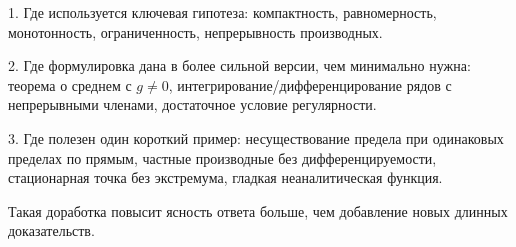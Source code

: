 \documentclass[12pt,a4paper]{article}
\begin{document}
1. Где используется ключевая гипотеза: компактность, равномерность,
монотонность, ограниченность, непрерывность производных.

2. Где формулировка дана в более сильной версии, чем минимально нужна:
теорема о среднем с \(g\ne0\), интегрирование/дифференцирование рядов с
непрерывными членами, достаточное условие регулярности.

3. Где полезен один короткий пример: несуществование предела при одинаковых
пределах по прямым, частные производные без дифференцируемости, стационарная
точка без экстремума, гладкая неаналитическая функция.

Такая доработка повысит ясность ответа больше, чем добавление новых длинных
доказательств.
\end{document}
